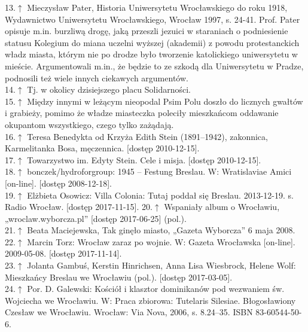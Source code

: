 \documentclass{article}
\begin{document}
13.\hyperref[113] {$\uparrow$} Mieczysław Pater, Historia Uniwersytetu Wrocławskiego do roku 1918, Wydawnictwo Uniwersytetu Wrocławskiego, Wrocław 1997, s. 24-41. Prof. Pater opisuje m.in. burzliwą drogę, jaką przeszli jezuici w staraniach o podniesienie statusu Kolegium do miana uczelni wyższej (akademii) z powodu protestanckich władz miasta, którym nie po drodze było tworzenie katolickiego uniwersytetu w mieście. Argumentowali m.in., że będzie to ze szkodą dla Uniwersytetu w Pradze, podnosili też wiele innych ciekawych argumentów.\label{13}\\
14.\hyperref[114]{$\uparrow$} Tj. w okolicy dzisiejszego placu Solidarności.\label{14}\\
15.\hyperref[115]{$\uparrow$} Między innymi w leżącym nieopodal Psim Polu doszło do licznych gwałtów i grabieży, pomimo że władze miasteczka poleciły mieszkańcom oddawanie okupantom wszystkiego, czego tylko zażądają.\label{15}\\
16.\hyperref[116]{$\uparrow$} Teresa Benedykta od Krzyża Edith Stein (1891–1942), zakonnica, Karmelitanka Bosa, męczennica. [dostęp 2010-12-15].\label{16}\\
17.\hyperref[117]{$\uparrow$} Towarzystwo im. Edyty Stein. Cele i misja. [dostęp 2010-12-15].\label{17}\\
18.\hyperref[118]{$\uparrow$} bonczek/hydroforgroup: 1945 – Festung Breslau. W: Wratislaviae Amici [on-line]. [dostęp 2008-12-18].\label{18}\\
19.\hyperref[rysunek13]{$\uparrow$} Elżbieta Osowicz: Villa Colonia: Tutaj poddał się Breslau. 2013-12-19. s. Radio Wrocław. [dostęp 2017-11-15].
20.\hyperref[220]{$\uparrow$} Wspaniały album o Wrocławiu, „wroclaw.wyborcza.pl” [dostęp 2017-06-25] (pol.).\label{20}\\
21.\hyperref[221]{$\uparrow$} Beata Maciejewska, Tak ginęło miasto, „Gazeta Wyborcza” 6 maja 2008.\label{21}\\
22.\hyperref[222]{$\uparrow$} Marcin Torz: Wrocław zaraz po wojnie. W: Gazeta Wrocławska [on-line]. 2009-05-08. [dostęp 2017-11-14].\label{22}\\
23.\hyperref[223]{$\uparrow$} Jolanta Gambuś, Kerstin Hinrichsen, Anna Lisa Wiesbrock, Helene Wolf: Mieszkańcy Breslau we Wrocławiu (pol.). [dostęp 2017-03-05].\label{23}\\
24.\hyperref[224]{$\uparrow$} Por. D. Galewski: Kościół i klasztor dominikanów pod wezwaniem św. Wojciecha we Wrocławiu. W: Praca zbiorowa: Tutelaris Silesiae. Błogosławiony Czesław we Wrocławiu. Wrocław: Via Nova, 2006, s. 8.24–35. ISBN 83-60544-50-6.\label{24}\\
\end{document}
